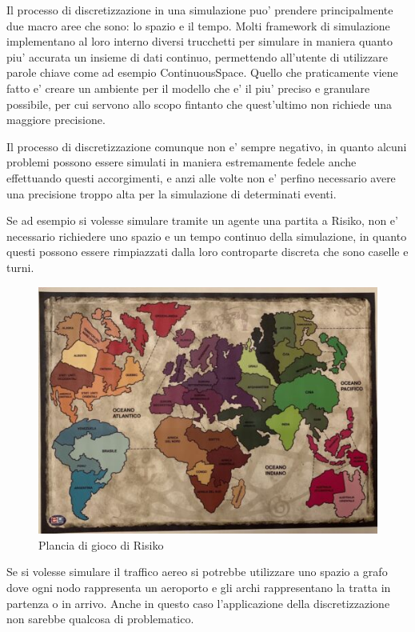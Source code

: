 Il processo di discretizzazione in una simulazione puo' prendere 
principalmente due macro aree che sono: lo spazio e il tempo. 
Molti framework di simulazione implementano al loro interno 
diversi trucchetti per simulare in maniera quanto piu' accurata
un insieme di dati continuo, permettendo all'utente di utilizzare
parole chiave come ad esempio ContinuousSpace. Quello che praticamente
viene fatto e' creare un ambiente per il modello che e' il piu'
preciso e granulare possibile, per cui servono allo scopo fintanto
che quest'ultimo non richiede una maggiore precisione. 

Il processo di discretizzazione comunque non e' sempre negativo, 
in quanto alcuni problemi possono essere simulati in maniera 
estremamente fedele anche effettuando questi accorgimenti, e anzi
alle volte non e' perfino necessario avere una precisione troppo 
alta per la simulazione di determinati eventi.

Se ad esempio si volesse simulare tramite un agente una partita 
a Risiko, non e' necessario richiedere uno spazio e un tempo continuo
della simulazione, in quanto questi possono essere rimpiazzati 
dalla loro controparte discreta che sono caselle e turni. 

\begin{figure}[h]
    \begin{center}
        \includegraphics[width=\linewidth]{img/s-l500.jpg}
        \caption{Plancia di gioco di Risiko}
        \label{fig:risiko}
    \end{center}
\end{figure}

Se si volesse simulare il traffico aereo si potrebbe utilizzare
uno spazio a grafo dove ogni nodo rappresenta un aeroporto e 
gli archi rappresentano la tratta in partenza o in arrivo. Anche in 
questo caso l'applicazione della discretizzazione non sarebbe 
qualcosa di problematico.